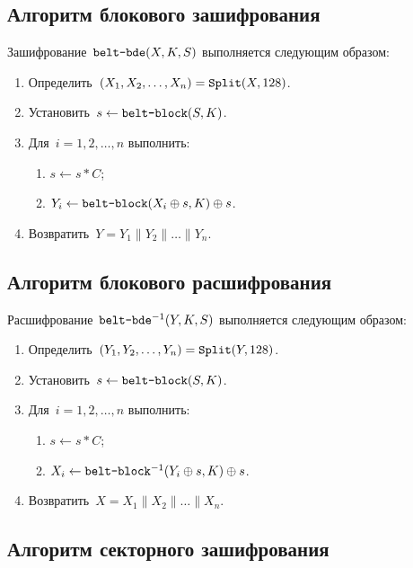 \subsection{Алгоритм блокового зашифрования}\label{DSK.BDE.Encr}

Зашифрование~$\texttt{belt-bde}(X,K,S)$ выполняется следующим образом: 
\begin{enumerate}
\item
Определить~$(X_1,X_2,\ldots,X_n)=\mathop{\texttt{Split}}\nolimits(X, 128)$.
\item
Установить~$s\leftarrow \texttt{belt-block}(S,K)$.
\item
Для~$i=1,2,\ldots,n$ выполнить: 
\begin{enumerate}
\item
$s\leftarrow s \ast C$;
\item
$Y_i\leftarrow\texttt{belt-block}(X_i\oplus s, K)\oplus s$.
\end{enumerate}
\item
Возвратить~$Y=Y_1\parallel Y_2\parallel\ldots\parallel Y_n$.
\end{enumerate}

\subsection{Алгоритм блокового расшифрования}\label{DSK.BDE.Decr}

Расшифрование~$\texttt{belt-bde}^{-1}(Y,K,S)$ выполняется следующим образом: 
\begin{enumerate}
\item
Определить~$(Y_1,Y_2,\ldots,Y_n)=\mathop{\texttt{Split}}\nolimits(Y,128)$.
\item
Установить~$s\leftarrow\texttt{belt-block}(S,K)$.
\item
Для~$i=1,2,\ldots,n$ выполнить: 
\begin{enumerate}
\item
$s\leftarrow s \ast C$;
\item
$X_i\leftarrow\texttt{belt-block}^{-1}(Y_i\oplus s, K)\oplus s$.
\end{enumerate}
\item
Возвратить~$X=X_1\parallel X_2\parallel\ldots\parallel X_n$.
\end{enumerate}

\subsection{Алгоритм секторного зашифрования}\label{DSK.SDE.Encr}


